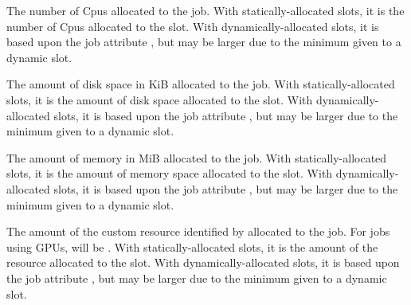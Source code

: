 \begin{description}

\label{CpusProvisioned}
\item[\AdAttr{CpusProvisioned}:]   
The number of Cpus allocated to the job.
With statically-allocated slots, it is the number of Cpus allocated to
the slot.
With dynamically-allocated slots, it is based upon the job attribute
, but may be larger due to the minimum given to
a dynamic slot.

\label{DiskProvisioned}
\item[\AdAttr{DiskProvisioned}:]   
The amount of disk space in KiB allocated to the job.
With statically-allocated slots, it is the amount of disk space allocated to
the slot.
With dynamically-allocated slots, it is based upon the job attribute
, but may be larger due to the minimum given to
a dynamic slot.

\label{MemoryProvisioned}
\item[\AdAttr{MemoryProvisioned}:]   
The amount of memory in MiB allocated to the job.
With statically-allocated slots, it is the amount of memory space allocated to
the slot.
With dynamically-allocated slots, it is based upon the job attribute
, but may be larger due to the minimum given to
a dynamic slot.

\label{<Name>Provisioned}
\item[\AdAttr{<Name>Provisioned}:]   
The amount of the custom resource identified by  allocated to 
the job.  
For jobs using GPUs,  will be .
With statically-allocated slots, 
it is the amount of the resource allocated to the slot.
With dynamically-allocated slots, it is based upon the job attribute
, but may be larger due to the minimum given to
a dynamic slot.

\end{description}
